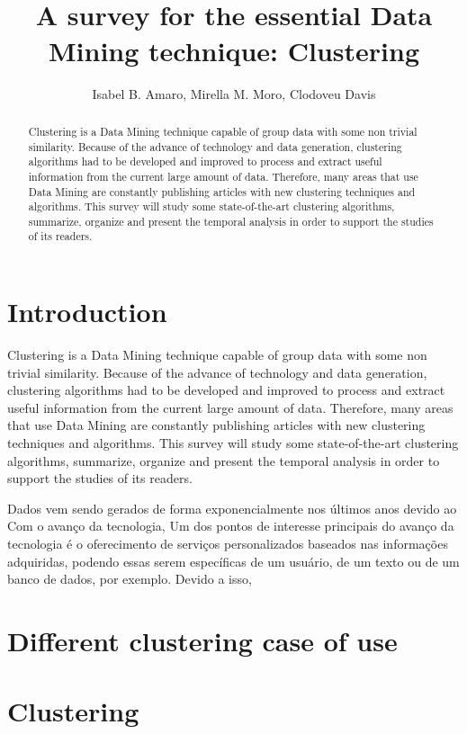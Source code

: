 \documentclass[12pt]{article}
\title{\\ A survey for the essential Data Mining technique: Clustering}
\author{Isabel B. Amaro\inst{1}, Mirella M. Moro\inst{2}, Clodoveu Davis\inst{3}}
\begin{document}
 

\maketitle

\begin{abstract}
Clustering is a Data Mining technique capable of group data with some non trivial similarity. Because of the advance of technology and data generation, clustering algorithms had to be developed and improved to process and extract useful information from the current large amount of data. Therefore, many areas that use Data Mining are constantly publishing articles with new clustering techniques and algorithms. This survey will study some state-of-the-art clustering algorithms, summarize, organize and present the temporal analysis in order to support the studies of its readers.
\end{abstract}

\section{Introduction}
Clustering is a Data Mining technique capable of group data with some non trivial similarity. Because of the advance of technology and data generation, clustering algorithms had to be developed and improved to process and extract useful information from the current large amount of data. Therefore, many areas that use Data Mining are constantly publishing articles with new clustering techniques and algorithms. This survey will study some state-of-the-art clustering algorithms, summarize, organize and present the temporal analysis in order to support the studies of its readers.

Dados vem sendo gerados de forma exponencialmente nos últimos anos devido ao
Com o avanço da tecnologia, 
Um dos pontos de interesse principais do avanço da tecnologia é o oferecimento de serviços personalizados baseados nas informações adquiridas, podendo essas serem específicas de um usuário, de um texto ou de um banco de dados, por exemplo. Devido a isso, 

\section{Different clustering case of use}

\section{Clustering}
\end{document}
